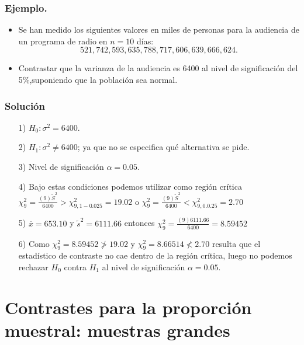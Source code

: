 \begin{frame}
\frametitle{Ejemplo.}
\begin{itemize}
\item Se han medido los siguientes valores en miles de personas para la audiencia de un programa de radio en $n=10$ días:
    $$521, 742, 593, 635, 788, 717, 606, 639, 666, 624.$$
\item  Contrastar que la varianza de la audiencia es 6400 al nivel de significación del 5\%,suponiendo que la población sea normal.
\end{itemize}
\end{frame}

\begin{frame}
\frametitle{Solución}
\begin{itemize}
\item[1)] $H_{0}:\sigma^2=6400.$
\item[2)] $H_{1}:\sigma^2\not=6400$; ya que no se especifica qué alternativa se pide.
\item[3)] Nivel de significación $\alpha=0.05$.
\item[4)] Bajo estas condiciones podemos utilizar como región crítica 
        $\chi_{9}^2=\frac{(9)
    \tilde{S}^2}{6400}>\chi_{9,1-0.025}^2=19.02$ o
        $\chi_{9}^2=\frac{(9)
    \tilde{S}^2}{6400}<\chi_{9,0.0.25}^2=2.70$
\end{itemize}
\end{frame}

\begin{frame}
\begin{itemize}
\item[5)] $\overline{x}=653.10$ y $\tilde{s}^2= 6111.66$ entonces $\chi_{9}^2=\frac{(9)  6111.66}{6400}=8.59452$
\item[6)] Como $\chi_{9}^2=8.59452\not>19.02$ y $\chi_{9}^2=8.66514\not<2.70$ resulta que el estadístico de contraste no cae dentro de la región crítica, luego no podemos rechazar $H_{0}$ contra $H_{1}$ al nivel de significación $\alpha=0.05$.
\end{itemize}
\end{frame}

\section{Contrastes para la proporción muestral: muestras grandes}


